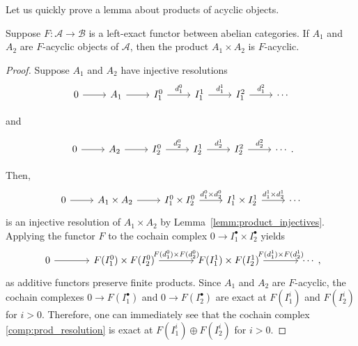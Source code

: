Let us quickly prove a lemma about products of acyclic objects.
\begin{lemm}\label{lemm:acyclic_prod}
  Suppose $F:\mathcal{A}\to\mathcal{B}$ is a left-exact functor between
  abelian categories. If $A_{1}$ and $A_{2}$ are $F$-acyclic objects of
  $\mathcal{A}$, then the product $A_{1}\times A_{2}$ is $F$-acyclic.
\end{lemm}
\begin{proof}
  Suppose $A_{1}$ and $A_{2}$ have injective resolutions
  \[\begin{tikzcd}
    0\rar & A_1\rar & I_1^0\rar{d_1^0} & I_1^1\rar{d_1^1} &
    I_1^2\rar{d_1^2} & \cdots
  \end{tikzcd}\]
  \begin{center}
    and
  \end{center}
  \[\begin{tikzcd}
    0\rar & A_2\rar & I_2^0\rar{d_2^0} & I_2^1\rar{d_2^1}
    & I_2^2\rar{d_2^2} & \cdots
  \end{tikzcd}.\]

  Then,
  \[\begin{tikzcd}
      0\rar & A_{1}\times A_{2}\rar & I_{1}^{0}\times I_{2}^{0}
      \rar{d_{1}^{0}\times d_{2}^{0}} & I_{1}^{1}\times I_{2}^{1}
      \rar{d_{1}^{1}\times d_{2}^{1}} & \cdots
    \end{tikzcd}\]
  is an injective resolution of $A_{1}\times A_{2}$ by
  Lemma~\ref{lemm:product_injectives}. Applying the functor $F$ to the
  cochain complex $0\to I_{1}^{\bullet}\times I_{2}^{\bullet}$ yields
  \begin{equation}\label{comp:prod_resolution}
    \begin{tikzcd}[column sep=large]
      0\rar & F(I_{1}^{0})\times F(I_{2}^{0})
      \rar{F(d_{1}^{0})\times F(d_{2}^{0})} & F(I_{1}^{1})\times F(I_{2}^{1})
      \rar{F(d_{1}^{1})\times F(d_{2}^{1})} & \cdots
    \end{tikzcd},
  \end{equation}
  as additive functors preserve finite products. Since $A_{1}$ and $A_{2}$
  are $F$-acyclic, the cochain complexes $0\to F\left(I_{1}^{\bullet}\right)$
  and $0\to F\left(I_{2}^{\bullet}\right)$ are exact at
  $F\left(I_{1}^{i}\right)$ and $F\left(I_{2}^{i}\right)$ for $i>0$.
  Therefore, one can immediately see that the cochain complex
  \eqref{comp:prod_resolution} is exact at
  $F\left(I_{1}^{i}\right)\oplus F\left(I_{2}^{i}\right)$ for $i>0$.
\end{proof}

